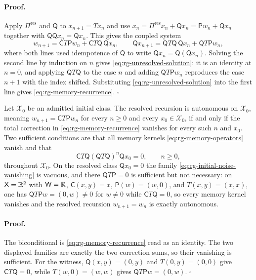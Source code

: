 \paragraph{Proof.}
Apply $\Pi^{\mathrm{res}}$ and $\mathsf Q$ to $x_{n+1}=Tx_n$ and use
$x_n=\Pi^{\mathrm{res}}x_n+\mathsf Qx_n=\mathsf Pw_n+\mathsf Qx_n$ together with
$\mathsf Q\mathsf Qx_n=\mathsf Qx_n$.  This gives the coupled system
\[
w_{n+1}=\mathsf CT\mathsf Pw_n+\mathsf CT\mathsf Q\,\mathsf Qx_n,
\qquad
\mathsf Qx_{n+1}=\mathsf QT\mathsf Q\,\mathsf Qx_n+\mathsf QT\mathsf Pw_n,
\]
where both lines used idempotence of $\mathsf Q$ to write
$\mathsf Q x_n=\mathsf Q(\mathsf Qx_n)$.  Solving the
second line by induction on $n$ gives
\eqref{eq:rg-unresolved-solution}: it is an identity at $n=0$, and applying
$\mathsf QT\mathsf Q$ to the case $n$ and adding
$\mathsf QT\mathsf Pw_n$ reproduces the case $n+1$ with the index shifted.
Substituting \eqref{eq:rg-unresolved-solution} into the first line gives
\eqref{eq:rg-memory-recurrence}. $\square$

Let $\mathcal X_0$ be an admitted initial class.  The resolved recursion is
autonomous on $\mathcal X_0$, meaning $w_{n+1}=\mathsf CT\mathsf Pw_n$ for every
$n\geq0$ and every $x_0\in\mathcal X_0$, if and only if the total correction in
\eqref{eq:rg-memory-recurrence} vanishes for every such $n$ and $x_0$.  Two
sufficient conditions are that all memory kernels
\eqref{eq:rg-memory-operators} vanish and that
\begin{equation}
\mathsf CT\mathsf Q(\mathsf QT\mathsf Q)^{n}\mathsf Qx_0=0,
\qquad n\geq0,
\label{eq:rg-initial-noise-vanishing}
\end{equation}
throughout $\mathcal X_0$.  On the resolved class $\mathsf Qx_0=0$ the family
\eqref{eq:rg-initial-noise-vanishing} is vacuous, and there
$\mathsf QT\mathsf P=0$ is sufficient but not necessary: on
$\mathsf X=\mathbb R^2$ with $\mathsf W=\mathbb R$, $\mathsf C(x,y)=x$,
$\mathsf P(w)=(w,0)$, and $T(x,y)=(x,x)$, one has
$\mathsf QT\mathsf Pw=(0,w)\neq0$ for $w\neq0$ while
$\mathsf CT\mathsf Q=0$, so every memory kernel vanishes and the resolved
recursion $w_{n+1}=w_n$ is exactly autonomous. 

\paragraph{Proof.}
The biconditional is \eqref{eq:rg-memory-recurrence} read as an identity.  The
two displayed families are exactly the two correction sums, so their vanishing
is sufficient.  For the witness, $\mathsf Q(x,y)=(0,y)$ and
$T(0,y)=(0,0)$ give $\mathsf CT\mathsf Q=0$, while
$T(w,0)=(w,w)$ gives $\mathsf QT\mathsf Pw=(0,w)$. $\square$

